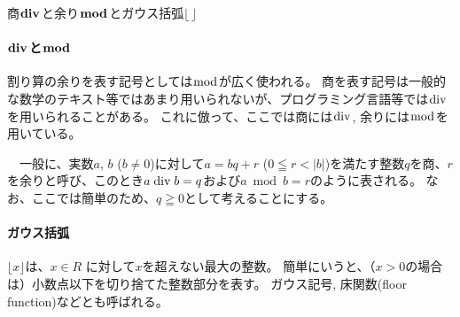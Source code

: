 \begin{Column}{商$\boldsymbol{\bDiv}$と余り$\boldsymbol{\bmod}$とガウス括弧$\boldsymbol{\lfloor\,\rfloor}$}
\renewcommand\theequation{c\thechapter.\arabic{equation}}
\setcounter{equation}{0}
\paragraph*{$\boldsymbol\bDiv$と$\boldsymbol\bmod$}
割り算の余りを表す記号としては$\bmod$が広く使われる。
商を表す記号は一般的な数学のテキスト等ではあまり用いられないが、プログラミング言語等では$\bDiv$を用いられることがある。
これに倣って、ここでは商には$\bDiv$, 余りには$\bmod$を用いている。

　一般に、実数$a$, $b$ ($b\neq0$)に対して$a = bq+r$ ($0 \leqq r < |b|$)を満たす整数$q$を商、$r$を余りと呼び、このとき$a \bDiv b = q$および$a \bmod b = r$のように表される。
なお、ここでは簡単のため、$q \geqq 0$として考えることにする。
\tcbline*
\paragraph*{ガウス括弧}
$\lfloor x\rfloor$は、$x \in R$ に対して$x$を超えない最大の整数。
簡単にいうと、（$x > 0$の場合は）小数点以下を切り捨てた整数部分を表す。
ガウス記号, 床関数(floor function)などとも呼ばれる。
\end{Column}




